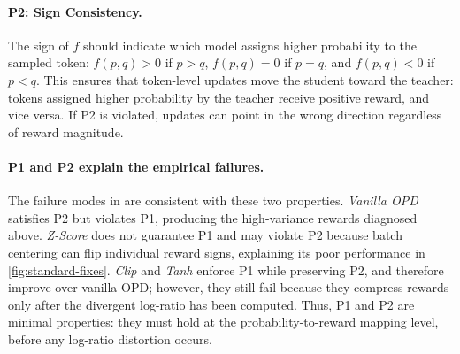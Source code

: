 \paragraph{P2: Sign Consistency.}
The sign of \(f\) should indicate which model assigns higher probability to the sampled token:
\(f(p,q)>0\) if \(p>q\), \(f(p,q)=0\) if \(p=q\), and \(f(p,q)<0\) if \(p<q\).
This ensures that token-level updates move the student toward the teacher: tokens assigned higher probability by the teacher receive positive reward, and vice versa.
If P2 is violated, updates can point in the wrong direction regardless of reward magnitude.

\paragraph{P1 and P2 explain the empirical failures.}
The failure modes in  are consistent with these two properties. \emph{Vanilla OPD} satisfies P2 but violates P1, producing the high-variance rewards diagnosed above. \emph{Z-Score} does not guarantee P1 and may violate P2 because batch centering can flip individual reward signs, explaining its poor performance in \autoref{fig:standard-fixes}. \emph{Clip} and \emph{Tanh} enforce P1 while preserving P2, and therefore improve over vanilla OPD; however, they still fail because they compress rewards only after the divergent log-ratio has been computed. Thus, P1 and P2 are minimal properties: they must hold at the probability-to-reward mapping level, before any log-ratio distortion occurs.
